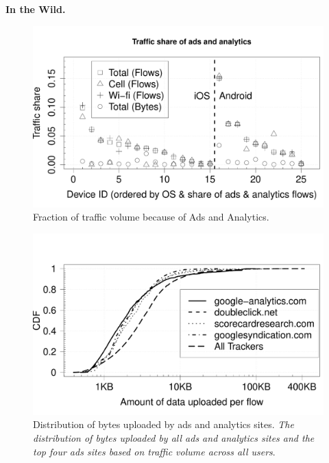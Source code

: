   {\bf In the Wild.}
\begin{figure}
\includegraphics[width=\columnwidth]{plots/ad_share_bytes.pdf}
\caption{Fraction of traffic volume because of Ads and Analytics. \emph{}}
\label{fig:description}
\end{figure}

\begin{figure}
\includegraphics[width=\columnwidth]{plots/distrib_ad_uploads.pdf}
\caption{Distribution of bytes uploaded by ads and analytics sites. \emph{The distribution of bytes uploaded by all ads and analytics sites and the top four ads sites based on traffic volume across all users}.}
\label{fig:description}
\end{figure}

